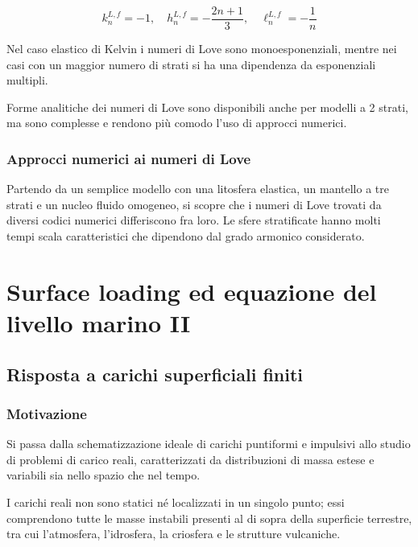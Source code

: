 \documentclass[a4paper,12pt]{book}
\begin{document}
\begin{equation}
    k_n^{L,f} = -1, \quad h_n^{L,f} = -\frac{2n+1}{3}, \quad \ell_n^{L,f} = -\frac{1}{n}
\end{equation}

\noindent
Nel caso elastico di Kelvin i numeri di Love sono monoesponenziali, mentre nei casi con un maggior numero di strati si ha una dipendenza da esponenziali multipli.

Forme analitiche dei numeri di Love sono disponibili anche per modelli a 2 strati, ma sono complesse e rendono più comodo l'uso di approcci numerici.

\subsubsection{\textcolor{colore7}{Approcci numerici ai numeri di Love}}

Partendo da un semplice modello con una litosfera elastica, un mantello a tre strati e un nucleo fluido omogeneo, si scopre che i numeri di Love trovati da diversi codici numerici differiscono fra loro.
Le sfere stratificate hanno molti tempi scala caratteristici che dipendono dal grado armonico considerato.

\newpage

\section{\textcolor{colore7}{Surface loading ed equazione del livello marino II}}

\subsection{\textcolor{colore7}{Risposta a carichi superficiali finiti}}

\subsubsection{Motivazione}

Si passa dalla schematizzazione ideale di carichi puntiformi e impulsivi allo studio di problemi di carico reali,
caratterizzati da distribuzioni di massa estese e variabili sia nello spazio che nel tempo.

I carichi reali non sono statici né localizzati in un singolo punto; essi comprendono tutte le masse instabili presenti al di sopra della superficie terrestre, tra cui l'atmosfera, l'idrosfera, la criosfera e le strutture vulcaniche.
\end{document}
